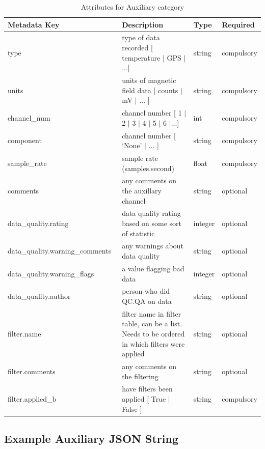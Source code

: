 \documentclass{article}
\begin{document}
\begin{table}[htb!]
    \caption[Attributes for Auxiliary Channel]{Attributes for Auxiliary category}
    \begin{tabular}{|l|p{3in}|l|l|}
        \hline
        \textbf{Metadata Key} & \textbf{Description} & \textbf{Type} & \textbf{Required} \\ \hline
        type\ & type of data recorded [ temperature $|$ GPS $|$ ...] & string & compulsory \\ \hline
        units\ & units of magnetic field data [ counts $|$ mV $|$ ... ] & string &  compulsory \\ \hline
        channel\_num\ & channel number [ 1 $|$ 2 $|$ 3 $|$ 4 $|$ 5 $|$ 6 $|$...] & int &  compulsory \\ \hline
        component\ & channel number [ `None' $|$ ... ] & string &  compulsory \\ \hline
        sample\_rate\ & sample rate (samples.second) & float &  compulsory \\ \hline
        comments\ & any comments on the auxillary channel & string &  optional \\ \hline
        data\_quality.rating\ & data quality rating based on some sort of statistic & integer &  optional \\ \hline
        data\_quality.warning\_comments\ & any warnings about data quality & string &   optional \\ \hline
        data\_quality.warning\_flags\ & a value flagging bad data  & integer &  optional \\ \hline
        data\_quality.author\ & person who did QC.QA on data & string &   optional \\ \hline
        filter.name\ & filter name in filter table, can be a list. Needs to be ordered in which filters were applied & string &  optional \\ \hline
        filter.comments\ & any comments on the filtering & string &  optional \\ \hline
        filter.applied\_b & have filters been applied [ True $|$ False ] & string & compulsory \\ \hline
    \end{tabular}
    \label{tab:aux}
\end{table}

\subsection{Example Auxiliary JSON String} 
\end{document}
